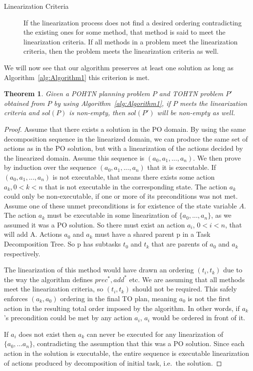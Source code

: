 \documentclass[letterpaper]{article} %
\newtheorem{theorem}{Theorem}
\begin{document}
\begin{description}
	\item[Linearization Criteria] If the linearization process does not find a desired ordering contradicting the existing ones for some method, that method is said to meet the linearization criteria.
	If all methods in a problem meet the linearization criteria, then the problem meets the linearization criteria as well. 
\end{description}
We will now see that our algorithm preserves at least one solution as long as Algorithm~\ref{alg:Algorithm1} this criterion is met.

\begin{theorem}\label{thm:SpecialCase}
	Given a POHTN planning problem $P$ and TOHTN problem $P'$ obtained from $P$ by using Algorithm~\ref{alg:Algorithm1}, if $P$ meets the linearization criteria and $sol(P)$ is non-empty, then $sol(P')$ will be non-empty as well.
\end{theorem}
\begin{proof}
	Assume that there exists a solution in the PO domain. By using the same decomposition sequence in the linearized domain, we can produce the same set of actions as in the PO solution, but with a linearization of the actions decided by the linearized domain. Assume this sequence is $(a_0, a_1, ..., a_n)$. We then prove by induction over the sequence $(a_0, a_1, ..., a_n)$ that it is executable.
	If $(a_0, a_1, ..., a_n)$ is not executable, that means there exists some action $a_k,  0 < k < n$ that is not executable in the corresponding state. The action $a_k$ could only be non-executable, if one or more of its preconditions was not met. Assume one of these unmet preconditions is for existence of the state variable $A$.
	The action $a_k$ must be executable in some linearization of $\{a_0, ..., a_n\}$, as we assumed it was a PO solution. So there must exist an action $a_i$, $0 < i < n$, that will add A. Actions $a_0$ and $a_k$ must have a shared parent p in a Task Decomposition Tree. So p has subtasks $t_0$ and $t_k$ that are parents of $a_0$ and $a_k$ respectively. 
	
	The linearization of this method would have drawn an ordering $(t_i, t_k)$ due to the way the algorithm defines $prec^{*}, add^{*}$ etc. We are assuming that all methods meet the linearization criteria, so $(t_i, t_k)$ should not be required. This safely enforces $(a_k, a_0)$ ordering in the final TO plan, meaning $a_0$ is not the first action in the resulting total order imposed by the algorithm. In other words, if $a_k$’s precondition could be met by any action $a_i$, $a_i$ would be ordered in front of it. 
	
	If $a_i$ does not exist then $a_k$ can never be executed for any linearization of $\{a_0, ...a_n\}$, contradicting the assumption that this was a PO solution. Since each action in the solution is executable, the entire sequence is executable linearization of actions produced by decomposition of initial task, i.e.\ the solution.
\end{proof}
\end{document}
